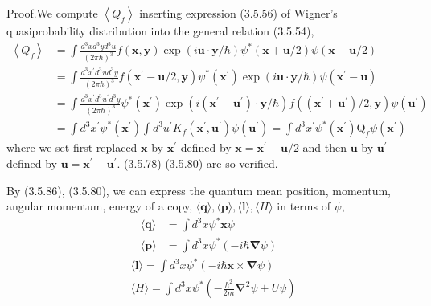 \documentclass{article}
\begin{document}
Proof.We compute $\left\langle Q_{f}\right\rangle$ inserting expression (3.5.56) of Wigner's quasiprobability distribution into the general relation (3.5.54),
$$
\begin{align*}
\left\langle Q_{f}\right\rangle & =\int \frac{d^{3} x d^{3} y d^{3} u}{(2 \pi \hbar)^{3}} f(\boldsymbol{x}, \boldsymbol{y}) \exp (i \boldsymbol{u} \cdot \boldsymbol{y} / \hbar) \psi^{*}(\boldsymbol{x}+\boldsymbol{u} / 2) \psi(\boldsymbol{x}-\boldsymbol{u} / 2)  \tag{3.5.81}\\
& =\int \frac{d^{3} x^{\prime} d^{3} u d^{3} y}{(2 \pi \hbar)^{3}} f\left(\boldsymbol{x}^{\prime}-\boldsymbol{u} / 2, \boldsymbol{y}\right) \psi^{*}\left(\boldsymbol{x}^{\prime}\right) \exp (i \boldsymbol{u} \cdot \boldsymbol{y} / \hbar) \psi\left(\boldsymbol{x}^{\prime}-\boldsymbol{u}\right) \\
& =\int \frac{d^{3} x^{\prime} d^{3} u^{\prime} d^{3} y}{(2 \pi \hbar)^{3}} \psi^{*}\left(\boldsymbol{x}^{\prime}\right) \exp \left(i\left(\boldsymbol{x}^{\prime}-\boldsymbol{u}^{\prime}\right) \cdot \boldsymbol{y} / \hbar\right) f\left(\left(\boldsymbol{x}^{\prime}+\boldsymbol{u}^{\prime}\right) / 2, \boldsymbol{y}\right) \psi\left(\boldsymbol{u}^{\prime}\right) \\
& =\int d^{3} x^{\prime} \psi^{*}\left(\boldsymbol{x}^{\prime}\right) \int d^{3} u^{\prime} K_{f}\left(\boldsymbol{x}^{\prime}, \boldsymbol{u}^{\prime}\right) \psi\left(\boldsymbol{u}^{\prime}\right)=\int d^{3} x^{\prime} \psi^{*}\left(\boldsymbol{x}^{\prime}\right) \mathrm{Q}_{f} \psi\left(\boldsymbol{x}^{\prime}\right)
\end{align*}
$$
where we set first replaced $\boldsymbol{x}$ by $\boldsymbol{x}^{\prime}$ defined by $\boldsymbol{x}=\boldsymbol{x}^{\prime}-\boldsymbol{u} / 2$ and then $\boldsymbol{u}$ by $\boldsymbol{u}^{\prime}$ defined by $\boldsymbol{u}=\boldsymbol{x}^{\prime}-\boldsymbol{u}^{\prime}$. (3.5.78)-(3.5.80) are so verified.

By (3.5.86), (3.5.80), we can express the quantum mean position, momentum, angular momentum, energy of a copy, $\langle\boldsymbol{q}\rangle,\langle\boldsymbol{p}\rangle,\langle\boldsymbol{l}\rangle,\langle H\rangle$ in terms of $\psi$,
$$
\begin{align*}
\langle\boldsymbol{q}\rangle & =\int d^{3} x \psi^{*} \boldsymbol{x} \psi  \tag{3.5.82}\\
\langle\boldsymbol{p}\rangle & =\int d^{3} x \psi^{*}(-i \hbar \boldsymbol{\nabla} \psi) \tag{3.5.83}
\end{align*}
$$
$$
\begin{align*}
& \langle\boldsymbol{l}\rangle=\int d^{3} x \psi^{*}(-i \hbar \boldsymbol{x} \times \boldsymbol{\nabla} \psi)  \tag{3.5.84}\\
& \langle H\rangle=\int d^{3} x \psi^{*}\left(-\frac{\hbar^{2}}{2 m} \boldsymbol{\nabla}^{2} \psi+U \psi\right) \tag{3.5.85}
\end{align*}
$$
\end{document}
